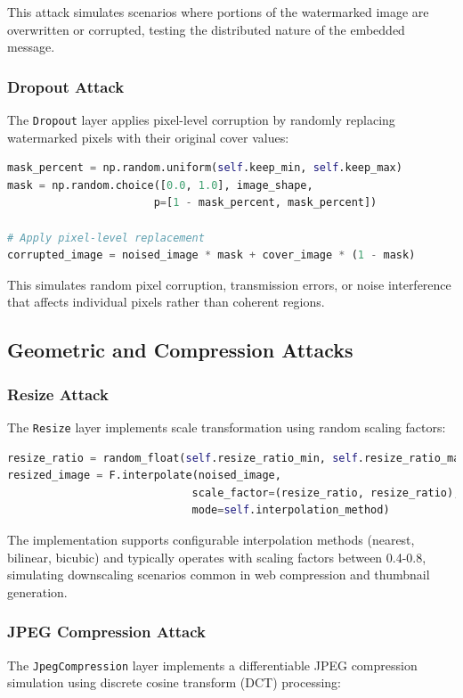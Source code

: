 \documentclass[12pt,a4paper]{report}
\begin{document}
This attack simulates scenarios where portions of the watermarked image are overwritten or corrupted, testing the distributed nature of the embedded message.

\subsubsection{Dropout Attack}
The \texttt{Dropout} layer applies pixel-level corruption by randomly replacing watermarked pixels with their original cover values:

\begin{lstlisting}[language=Python, caption=Dropout Attack Implementation]
mask_percent = np.random.uniform(self.keep_min, self.keep_max)
mask = np.random.choice([0.0, 1.0], image_shape, 
                       p=[1 - mask_percent, mask_percent])

# Apply pixel-level replacement
corrupted_image = noised_image * mask + cover_image * (1 - mask)
\end{lstlisting}

This simulates random pixel corruption, transmission errors, or noise interference that affects individual pixels rather than coherent regions.

\subsection{Geometric and Compression Attacks}

\subsubsection{Resize Attack}
The \texttt{Resize} layer implements scale transformation using random scaling factors:

\begin{lstlisting}[language=Python, caption=Resize Attack Implementation]
resize_ratio = random_float(self.resize_ratio_min, self.resize_ratio_max)
resized_image = F.interpolate(noised_image,
                             scale_factor=(resize_ratio, resize_ratio),
                             mode=self.interpolation_method)
\end{lstlisting}

The implementation supports configurable interpolation methods (nearest, bilinear, bicubic) and typically operates with scaling factors between 0.4-0.8, simulating downscaling scenarios common in web compression and thumbnail generation.

\subsubsection{JPEG Compression Attack}
The \texttt{JpegCompression} layer implements a differentiable JPEG compression simulation using discrete cosine transform (DCT) processing:
\end{document}
